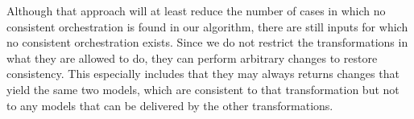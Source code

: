 Although that approach will at least reduce the number of cases in which no consistent orchestration is found in our algorithm, there are still inputs for which no consistent orchestration exists.
Since we do not restrict the transformations in what they are allowed to do, they can perform arbitrary changes to restore consistency.
This especially includes that they may always returns changes that yield the same two models, which are consistent to that transformation but not to any models that can be delivered by the other transformations.


